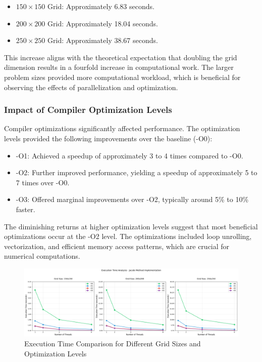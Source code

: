 \documentclass{article}
\begin{document}
\begin{itemize}
    \item $150\times150$ Grid: Approximately 6.83 seconds.
    \item $200\times200$ Grid: Approximately 18.04 seconds.
    \item $250\times250$ Grid: Approximately 38.67 seconds.
\end{itemize}

This increase aligns with the theoretical expectation that doubling the grid dimension results in a fourfold increase in computational work. The larger problem sizes provided more computational workload, which is beneficial for observing the effects of parallelization and optimization.

\subsubsection{Impact of Compiler Optimization Levels}

Compiler optimizations significantly affected performance. The optimization levels provided the following improvements over the baseline (-O0):

\begin{itemize}
    \item -O1: Achieved a speedup of approximately 3 to 4 times compared to -O0.
    \item -O2: Further improved performance, yielding a speedup of approximately 5 to 7 times over -O0.
    \item -O3: Offered marginal improvements over -O2, typically around 5\% to 10\% faster.
\end{itemize}

The diminishing returns at higher optimization levels suggest that most beneficial optimizations occur at the -O2 level. The optimizations included loop unrolling, vectorization, and efficient memory access patterns, which are crucial for numerical computations.

\begin{figure}[H]
    \centering
    \includegraphics[width=\linewidth]{Images/Plot1.png}
    \caption{Execution Time Comparison for Different Grid Sizes and Optimization Levels}
    \label{fig:plot1}
\end{figure}
\end{document}
